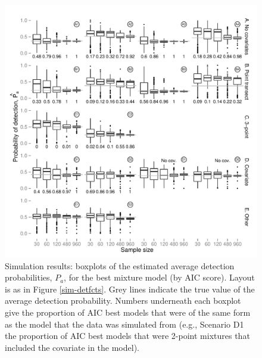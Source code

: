 \documentclass[authoryear,preprint,review,12pt]{elsarticle}
\begin{document}
\begin{figure}
\centering
\includegraphics[width=\textwidth]{simulations/pa-plot-mmds.pdf}
\caption{Simulation results: boxplots of the estimated average detection probabilities, $P_a$, for the best mixture model (by AIC score). Layout is as in Figure \ref{sim-detfcts}. Grey lines indicate the true value of the average detection probability. Numbers underneath each boxplot give the proportion of AIC best models that were of the same form as the model that the data was simulated from (e.g., Scenario D1 the proportion of AIC best models that were 2-point mixtures that included the covariate in the model).}
\label{sim-boxplots}
\end{figure}
\end{document}
